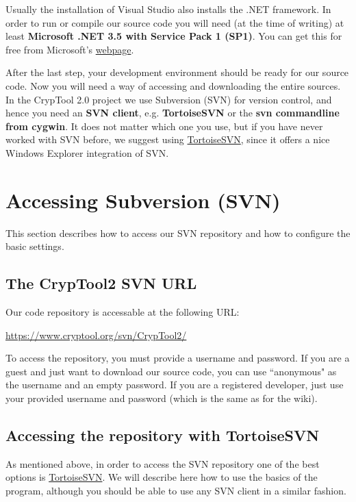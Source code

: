 Usually the installation of Visual Studio also installs the .NET framework. In order to run or compile our source code you will need (at the time of writing) at least \textbf{Microsoft .NET 3.5 with Service Pack 1 (SP1)}. You can get this for free from Microsoft's \href{http://download.microsoft.com/download/2/0/e/20e90413-712f-438c-988e-fdaa79a8ac3d/dotnetfx35.exe}{webpage}.

After the last step, your development environment should be ready for our source code. Now you will need a way of accessing and downloading the entire sources. In the CrypTool 2.0 project we use Subversion (SVN) for version control, and hence you need an \textbf{SVN client}, e.g. \textbf{TortoiseSVN} or the \textbf{svn commandline from cygwin}. It does not matter which one you use, but if you have never worked with SVN before, we suggest using \href{http://www.tortoisesvn.net/}{TortoiseSVN}, since it offers a nice Windows Explorer integration of SVN.

\section{Accessing Subversion (SVN)}
\label{AccessingSubversion}

This section describes how to access our SVN repository and how to configure the basic settings.

\subsection*{The CrypTool2 SVN URL}
\label{TheCrypTool2SVNURL}

Our code repository is accessable at the following URL:

\url{https://www.cryptool.org/svn/CrypTool2/}

To access the repository, you must provide a username and password. If you are a guest and just want to download our source code, you can use ``anonymous" as the username and an empty password. If you are a registered developer, just use your provided username and password (which is the same as for the wiki).

\subsection*{Accessing the repository with TortoiseSVN}
\label{AccessingTheRepositoryWithTortoiseSVN}

As mentioned above, in order to access the SVN repository one of the best options is \href{http://www.tortoisesvn.net/}{TortoiseSVN}. We will describe here how to use the basics of the program, although you should be able to use any SVN client in a similar fashion.

